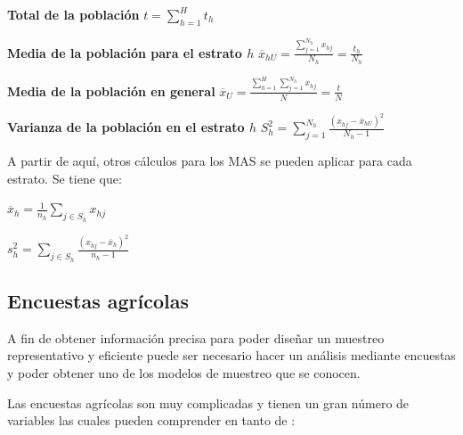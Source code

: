 \documentclass{report}
\begin{document}
\textbf{Total de la población}
\bigbreak
$t = \sum_{h=1}^H t_h$


\bigbreak

\textbf{Media de la población para el estrato $h$}
\bigbreak
$\overline{x}_{hU} = \frac{\sum_{j=1}^{N_h} x_{hj}}{N_h} = \frac{t_h}{N_h}$


\bigbreak

\textbf{Media de la población en general}
\bigbreak
$\overline{x}_U = \frac{\sum_{h=1}^H \sum_{j=1}^{N_h} x_{hj}}{N} = \frac{t}{N}$


\bigbreak

\textbf{Varianza de la población en el estrato $h$}
\bigbreak
$S_h^2 = \sum_{j=1}^{N_h} \frac{(x_{hj} - \overline{x}_{hU})^2}{N_h - 1}$


\bigbreak

A partir de aquí, otros cálculos para los MAS se pueden aplicar para cada estrato. Se tiene que:

\bigbreak

$\overline{x}_h = \frac{1}{n_h} \sum_{j \in S_h} x_{hj}$

\bigbreak

$s^2_h = \sum_{j \in S_h} \frac{(x_{hj} - \overline{x}_h)^2}{n_h - 1}$

\subsection{Encuestas agrícolas}

A fin de obtener información precisa para poder diseñar un muestreo representativo y eficiente puede ser necesario hacer un análisis mediante encuestas y poder obtener uno de los modelos de muestreo que se conocen.

\bigbreak

Las encuestas agrícolas son muy complicadas y tienen un gran número de variables las cuales pueden comprender en tanto de \cite{organizacion-de-las-naciones-unidas-para-la-agricultura-y-la-alimentacion-1990}:
\end{document}
